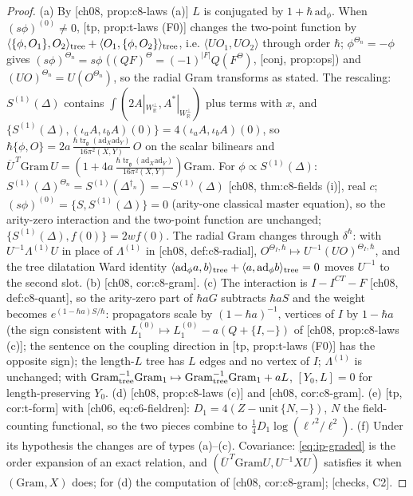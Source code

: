 \documentclass[11pt]{report}
\theoremstyle{plain}
\theoremstyle{definition}
\numberwithin{equation}{chapter}
\newcommand{\unit}{\tfrac{\hbar\operatorname{tr}_{\mathfrak g}(\mathrm{ad}_X\mathrm{ad}_Y)}{16\pi^2(X,Y)}}
\newcommand{\Wp}{W_{\mathbb R}^\perp}
\newcommand{\Gt}{\mathrm{Gram}_{\rm tree}}
\newcommand{\Go}{\mathrm{Gram}_{1}}
\begin{document}
\begin{proof}
(a) By [ch08, prop:c8-laws (a)] $L$ is conjugated by $1+\hbar\,\mathrm{ad}_\phi$. When $(s\phi)^{(0)}\neq0$, [tp, prop:t-laws (F0)] changes the two-point function by $\langle\{\phi,O_1\},O_2\rangle_{\rm tree}+\langle O_1,\{\phi,O_2\}\rangle_{\rm tree}$, i.e. $\langle UO_1,UO_2\rangle$ through order $\hbar$; $\phi^{\Theta_n}=-\phi$ gives $(s\phi)^{\Theta_n}=s\phi$ ($(QF)^\Theta=(-1)^{|F|}Q(F^\Theta)$, [conj, prop:ops]) and $(UO)^{\Theta_n}=U(O^{\Theta_n})$, so the radial Gram transforms as stated. The rescaling: $S^{(1)}(\Delta)$ contains $\int(2A|_{\Wp},A^*|_{\Wp})$ plus terms with $x$, and $\{S^{(1)}(\Delta),(\iota_aA,\iota_bA)(0)\}=4(\iota_aA,\iota_bA)(0)$, so $\hbar\{\phi,O\}=2a\,\unit\,O$ on the scalar bilinears and $\overline U^{\,T}\mathrm{Gram}\,U=(1+4a\,\unit)\mathrm{Gram}$. For $\phi\propto S^{(1)}(\Delta)$: $S^{(1)}(\Delta)^{\Theta_n}=S^{(1)}(\Delta^{\dagger_n})=-S^{(1)}(\Delta)$ [ch08, thm:c8-fields (i)], real $c$; $(s\phi)^{(0)}=\{S,S^{(1)}(\Delta)\}=0$ (arity-one classical master equation), so the arity-zero interaction and the two-point function are unchanged; $\{S^{(1)}(\Delta),f(0)\}=2wf(0)$. The radial Gram changes through $\delta^\hbar$: with $U^{-1}\Lambda^{(1)}U$ in place of $\Lambda^{(1)}$ in [ch08, def:c8-radial], $O^{\Theta_I,\hbar}\mapsto U^{-1}(UO)^{\Theta_I,\hbar}$, and the tree dilatation Ward identity $\langle\mathrm{ad}_\phi a,b\rangle_{\rm tree}+\langle a,\mathrm{ad}_\phi b\rangle_{\rm tree}=0$ moves $U^{-1}$ to the second slot. (b) [ch08, cor:c8-gram]. (c) The interaction is $I-I^{CT}-F$ [ch08, def:c8-quant], so the arity-zero part of $\hbar aG$ subtracts $\hbar aS$ and the weight becomes $e^{(1-\hbar a)S/\hbar}$: propagators scale by $(1-\hbar a)^{-1}$, vertices of $I$ by $1-\hbar a$ (the sign consistent with $L_1^{(0)}\mapsto L_1^{(0)}-a(Q+\{I,-\})$ of [ch08, prop:c8-laws (c)]; the sentence on the coupling direction in [tp, prop:t-laws (F0)] has the opposite sign); the length-$L$ tree has $L$ edges and no vertex of $I$; $\Lambda^{(1)}$ is unchanged; with $\Gt^{-1}\Go\mapsto\Gt^{-1}\Go+aL$, $[Y_0,L]=0$ for length-preserving $Y_0$. (d) [ch08, prop:c8-laws (c)] and [ch08, cor:c8-gram]. (e) [tp, cor:t-form] with [ch06, eq:c6-fieldren]: $D_1=4(Z-\text{unit}\,\{N,-\})$, $N$ the field-counting functional, so the two pieces combine to $\tfrac14D_1\log(\ell'^2/\ell^2)$. (f) Under its hypothesis the changes are of types (a)--(c). Covariance: \eqref{eq:ip-graded} is the order expansion of an exact relation, and $(\overline U^{\,T}\mathrm{Gram}U,U^{-1}XU)$ satisfies it when $(\mathrm{Gram},X)$ does; for (d) the computation of [ch08, cor:c8-gram]; [checks, C2].
\end{proof}
\end{document}
